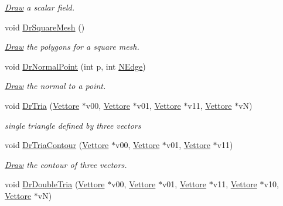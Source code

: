 \begin{DoxyCompactItemize}
\begin{DoxyCompactList}\small\item\em \hyperlink{classDraw}{Draw} a scalar field. \end{DoxyCompactList}\item 
void \hyperlink{classElPoly_a7ee6e038b2bc5f4d9440118b807e115e}{Dr\+Square\+Mesh} ()\hypertarget{classElPoly_a7ee6e038b2bc5f4d9440118b807e115e}{}\label{classElPoly_a7ee6e038b2bc5f4d9440118b807e115e}

\begin{DoxyCompactList}\small\item\em \hyperlink{classDraw}{Draw} the polygons for a square mesh. \end{DoxyCompactList}\item 
void \hyperlink{classElPoly_a6caa02ea64327736aab6533720461acc}{Dr\+Normal\+Point} (int p, int \hyperlink{classVarData_ae2e67b49132b33a026b19c647cbf4f3c}{N\+Edge})\hypertarget{classElPoly_a6caa02ea64327736aab6533720461acc}{}\label{classElPoly_a6caa02ea64327736aab6533720461acc}

\begin{DoxyCompactList}\small\item\em \hyperlink{classDraw}{Draw} the normal to a point. \end{DoxyCompactList}\item 
void \hyperlink{classElPoly_adcc85b143b5bbcb89aa5eabeb33b9ed6}{Dr\+Tria} (\hyperlink{classVettore}{Vettore} $\ast$v00, \hyperlink{classVettore}{Vettore} $\ast$v01, \hyperlink{classVettore}{Vettore} $\ast$v11, \hyperlink{classVettore}{Vettore} $\ast$vN)\hypertarget{classElPoly_adcc85b143b5bbcb89aa5eabeb33b9ed6}{}\label{classElPoly_adcc85b143b5bbcb89aa5eabeb33b9ed6}

\begin{DoxyCompactList}\small\item\em single triangle defined by three vectors \end{DoxyCompactList}\item 
void \hyperlink{classElPoly_ad7b11c55a050b47140f4063d6ad80756}{Dr\+Tria\+Contour} (\hyperlink{classVettore}{Vettore} $\ast$v00, \hyperlink{classVettore}{Vettore} $\ast$v01, \hyperlink{classVettore}{Vettore} $\ast$v11)\hypertarget{classElPoly_ad7b11c55a050b47140f4063d6ad80756}{}\label{classElPoly_ad7b11c55a050b47140f4063d6ad80756}

\begin{DoxyCompactList}\small\item\em \hyperlink{classDraw}{Draw} the contour of three vectors. \end{DoxyCompactList}\item 
void \hyperlink{classElPoly_a4f733cc712ac229489bff59b4b4f8c58}{Dr\+Double\+Tria} (\hyperlink{classVettore}{Vettore} $\ast$v00, \hyperlink{classVettore}{Vettore} $\ast$v01, \hyperlink{classVettore}{Vettore} $\ast$v11, \hyperlink{classVettore}{Vettore} $\ast$v10, \hyperlink{classVettore}{Vettore} $\ast$vN)\hypertarget{classElPoly_a4f733cc712ac229489bff59b4b4f8c58}{}\label{classElPoly_a4f733cc712ac229489bff59b4b4f8c58}


\end{DoxyCompactItemize}

